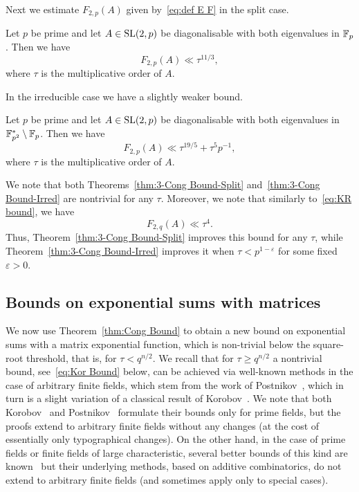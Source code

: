 \documentclass[12pt]{amsart}
\begin{document}
Next we estimate $F_{2,p}(A)$ given by~\eqref{eq:def E F} in the split case. 

\begin{thm}
\label{thm:3-Cong Bound-Split}
Let  $p$ be prime and let $A\in \operatorname{SL}(2,p)$ be diagonalisable with both eigenvalues
in ${\mathbb F}_p$. 
Then we have
$$
F_{2,p}(A) \ll \tau^{11/3}, 
$$
where $\tau$ is the multiplicative order of $A$.
\end{thm}

In the irreducible case we have a slightly weaker bound.


\begin{thm}
\label{thm:3-Cong Bound-Irred}
Let  $p$ be prime and let $A\in \operatorname{SL}(2,p)$ be diagonalisable with both eigenvalues
in ${\mathbb F}_{p^2}^* \setminus {\mathbb F}_p$. 
Then we have
$$
F_{2,p}(A) \ll  \tau^{19/5} + \tau^5 p^{-1}, 
$$
where $\tau$ is the multiplicative order of $A$.
\end{thm}


We note that both Theorems~\ref{thm:3-Cong Bound-Split} and~\ref{thm:3-Cong Bound-Irred} are nontrivial for any $\tau$. Moreover, we note that similarly to~\eqref{eq:KR bound}, we have 
$$
F_{2,q}(A) \ll \tau^4.
$$
Thus, Theorem~\ref{thm:3-Cong Bound-Split} improves this bound for any $\tau$, while Theorem~\ref{thm:3-Cong Bound-Irred} improves it when $\tau< p^{1-\varepsilon}$
for some fixed $\varepsilon > 0$.


   \subsection{Bounds on exponential sums with matrices}
We now use Theorem~\ref{thm:Cong Bound} to obtain a new bound on exponential sums with a matrix exponential function,
which is non-trivial below the square-root threshold, that is, for  $\tau < q^{n/2}$. 
We recall that for $\tau \ge q^{n/2}$ a nontrivial bound, see~\eqref{eq:Kor Bound} below,  can be achieved via  well-known methods
in the case of arbitrary finite fields, which stem from the work of Postnikov~\cite[Chapter~I, Section~4, Lemma~1]{Post}, 
which in turn is a slight variation of a classical result of Korobov~\cite{Kor}.  
We note that both  Korobov~\cite{Kor} and  Postnikov~\cite{Post} formulate their bounds only 
for prime fields, but the proofs extend to arbitrary finite fields without any changes (at the cost of 
essentially only typographical changes). On the other hand,  in the case of prime fields or 
finite fields of large characteristic, several better 
bounds of this kind are known~\cite{BBG, Bourg1, Bourg3, BourChan,  BGK,  DBGGGSST,   Shkr1.5} but their underlying methods, based on 
additive combinatorics, do not extend to arbitrary finite fields (and sometimes apply only to special cases). 
\end{document}
